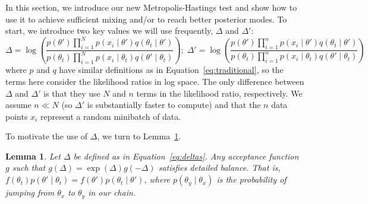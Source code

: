\documentclass{article}
\newtheorem{lemma}{Lemma}
\begin{document}
In this section, we introduce our new Metropolis-Hastings test and show how to use it to achieve
sufficient mixing and/or to reach better posterior modes. To start, we introduce two key values we
will use frequently, $\Delta$ and $\Delta'$:
\begin{equation}\label{eq:deltas}
\Delta = \log \left( \frac{p(\theta')  \prod_{i=1}^N p(x_i \mid \theta')  q(\theta_t \mid
\theta')}{p(\theta_t)\prod_{i=1}^N p(x_i \mid \theta_t)  q(\theta' \mid
\theta_t)} \right);\;  \Delta' = \log \left( \frac{p(\theta') \prod_{i=1}^n p(x_i \mid \theta') q(\theta_t \mid
\theta')}{p(\theta_t) \prod_{i=1}^n p(x_i \mid \theta_t) q(\theta' \mid
\theta_t)} \right)
\end{equation}
where $p$ and $q$ have similar definitions as in Equation~\ref{eq:traditional}, so the terms here
consider the likelihood ratios in log space. The only difference between $\Delta$ and $\Delta'$ is
that they use $N$ and $n$ terms in the likelihood ratio, respectively. We assume $n \ll N$ (so
$\Delta'$ is substantially faster to compute) and that the $n$ data points $x_i$ represent a random
minibatch of data.

To motivate the use of $\Delta$, we turn to Lemma~\ref{lem:detailed_balance}.

\begin{lemma}\label{lem:detailed_balance}
Let $\Delta$ be defined as in Equation~\ref{eq:deltas}. Any acceptance function $g$ such that
$g(\Delta) = \exp(\Delta) g(-\Delta )$ satisfies detailed balance. That is, $f(\theta_t)p(\theta'
\mid \theta_t) = f(\theta')p(\theta_t \mid \theta')$, where $p(\theta_y \mid \theta_x)$ is the
probability of jumping from $\theta_x$ to $\theta_y$ in our chain.
\end{lemma}
\end{document}
